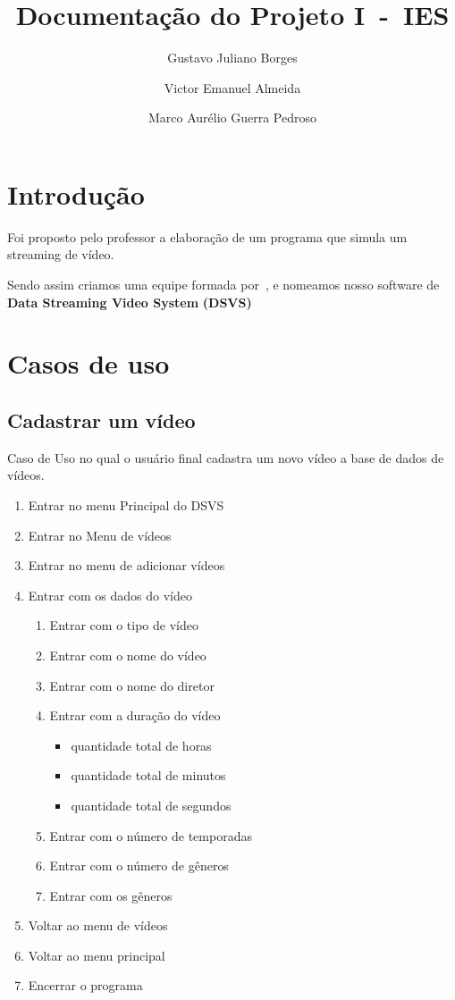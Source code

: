 \documentclass[12pt, a4paper]{article}
\author{Gustavo Juliano Borges \and Victor Emanuel Almeida \and Marco Aurélio Guerra Pedroso}
\title{Documentação do Projeto I~-~IES}
\begin{document}
\begin{titlepage}
\maketitle\thispagestyle{empty}
\end{titlepage}
\section{Introdução}

Foi proposto pelo professor a elaboração de um programa que simula um streaming de vídeo.

Sendo assim criamos uma equipe formada por~\textbf{\theauthor}, e nomeamos nosso software de \textbf{Data Streaming Video System} \textbf{(DSVS)}

\section{Casos de uso}

\subsection{Cadastrar um vídeo}
Caso de Uso no qual o usuário final cadastra um novo vídeo a base de dados de vídeos.
\begin{enumerate}
	\item Entrar no menu Principal do DSVS
	\item Entrar no Menu de vídeos
	\item Entrar no menu de adicionar vídeos
	\item Entrar com os dados do vídeo
		\begin{enumerate}
			\item Entrar com o tipo de vídeo
			\item Entrar com o nome do vídeo
			\item Entrar com o nome do diretor
			\item Entrar com a duração do vídeo
				\begin{itemize}
					\item quantidade total de horas
					\item quantidade total de minutos
					\item quantidade total de segundos
				\end{itemize}
			\item Entrar com o número de temporadas
			\item Entrar com o número de gêneros
			\item Entrar com os gêneros
		\end{enumerate}
	\item Voltar ao menu de vídeos
	\item Voltar ao menu principal
	\item Encerrar o programa
\end{enumerate}
\end{document}
